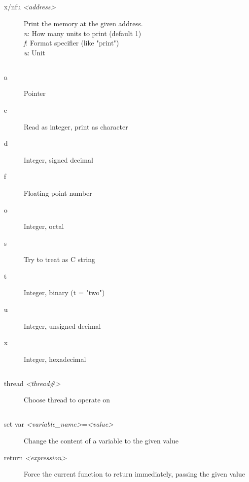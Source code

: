 \documentclass[10pt,landscape,a4paper]{article}
\newcommand{\blacksubsection}[1]{\subsection{\colorbox{black}{\makebox[\linewidth][c]{\textcolor{white}{#1}}}}}
\begin{document}
\begin{multicols}{3}
    \blacksubsection{Memory}
      \begin{description}
        \item[x/nfu \textit{<address>}] \parbox{8cm}{Print the memory at the given address. \\
                                        \textit{n}: How many units to print (default 1) \\
                                        \textit{f}: Format specifier (like "print") \\
                                        \textit{u}: Unit}
      \end{description}

    \blacksubsection{Format}
      \begin{description}
        \item[a] Pointer
        \item[c] Read as integer, print as character
        \item[d] Integer, signed decimal
        \item[f] Floating point number
        \item[o] Integer, octal
        \item[s] Try to treat as C string
        \item[t] Integer, binary (t = "two")
        \item[u] Integer, unsigned decimal
        \item[x] Integer, hexadecimal
      \end{description}

    \blacksubsection{Threads}
      \begin{description}
        \item[thread \textit{<thread\#>}] Choose thread to operate on
      \end{description}

    \blacksubsection{Manipulating the program}
      \begin{description}
        \item[set var \textit{<variable\_name>}=\textit{<value>}] Change the content of a variable to the given value
        \item[return \textit{<expression>}] Force the current function to return immediately, passing the given value
      \end{description}


\end{multicols}
\end{document}

